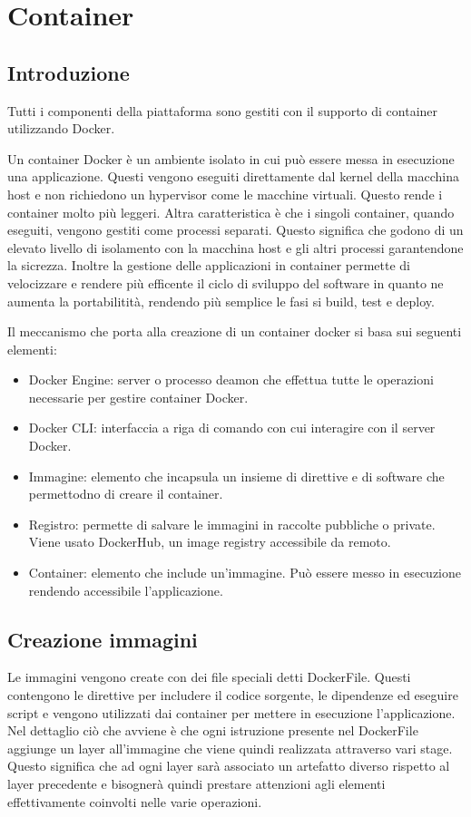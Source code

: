 \section{Container}
\subsection{Introduzione}
Tutti i componenti della piattaforma sono gestiti con il supporto di container utilizzando Docker.

Un container Docker è un ambiente isolato in cui può essere messa in esecuzione una applicazione.
Questi vengono eseguiti direttamente dal kernel della macchina host e non richiedono un hypervisor come le
macchine virtuali. Questo rende i container molto più leggeri. Altra caratteristica è che i singoli container,
quando eseguiti, vengono gestiti come processi separati. Questo significa che godono di un elevato livello di isolamento
con la macchina host e gli altri processi garantendone la sicrezza.
Inoltre la gestione delle applicazioni in container permette di velocizzare e rendere più efficente il ciclo di sviluppo del software in quanto
ne aumenta la portabilitità, rendendo più semplice le fasi si build, test e deploy.

Il meccanismo che porta alla creazione di un container docker si basa sui seguenti elementi:
\begin{itemize}
    \itemsep0em
    \item Docker Engine: server o processo deamon che effettua tutte le operazioni necessarie per gestire container Docker.
    \item Docker CLI: interfaccia a riga di comando con cui interagire con il server Docker.
    \item Immagine: elemento che incapsula un insieme di direttive e di software che permettodno di creare il container.
    \item Registro: permette di salvare le immagini in raccolte pubbliche o private. Viene usato DockerHub, un image registry accessibile da remoto.
    \item Container: elemento che include un'immagine. Può essere messo in esecuzione rendendo accessibile l'applicazione.
\end{itemize}

\subsection{Creazione immagini}

Le immagini vengono create con dei file speciali detti DockerFile.
Questi contengono le direttive per includere il codice sorgente, le dipendenze ed eseguire script e vengono utilizzati
dai container per mettere in esecuzione l'applicazione. Nel dettaglio ciò che avviene è che ogni istruzione
presente nel DockerFile aggiunge un layer all'immagine che viene quindi realizzata attraverso vari stage.
Questo significa che ad ogni layer sarà associato un artefatto diverso rispetto al layer precedente e bisognerà
quindi prestare attenzioni agli elementi effettivamente coinvolti nelle varie operazioni.

